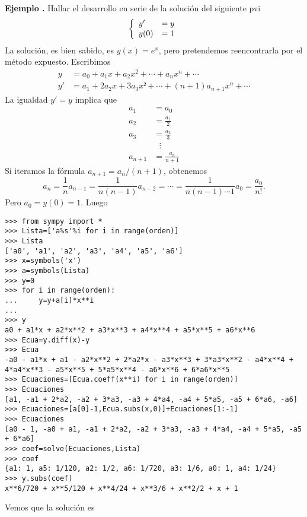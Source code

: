 \documentclass{article}
\newcounter{ejem_cont}
\newenvironment{ejemplo}[1]{\refstepcounter{ejem_cont}\vspace{1ex}\noindent\textbf{Ejemplo \arabic{ejem_cont}.} #1}{}
\begin{document}
\begin{ejemplo} Hallar el desarrollo en serie de la solución del siguiente pvi 
\[\left\{\begin{array}{l l} y'&=y\\ y(0)&=1\end{array}\right.\]
La solución, es bien sabido, es $y(x)=e^x$,  pero pretendemos reencontrarla por el método expuesto. Escribimos
\[\begin{split}
   y&=a_0+a_1x+a_2x^2+\cdots+a_nx^n+\cdots\\
   y'&=a_1+2a_2x+3a_3x²+\cdots+(n+1)a_{n+1}x^n+\cdots
  \end{split}
\]
La igualdad $y'=y$ implica que 
\[\begin{split}
   a_1&=a_0\\
   a_2&=\frac{a_1}{2}\\
   a_3&=\frac{a_2}{3}\\
      &\,\,\,\,\vdots \\
   a_{n+1}&=\frac{a_{n}}{n+1}
 \end{split}
\]
Si iteramos la fórmula $a_{n+1}=a_{n}/(n+1)$, obtenemos 
\[a_n=\frac{1}{n}a_{n-1}=\frac{1}{n(n-1)}a_{n-2}=\cdots=\frac{1}{n(n-1)\cdots 1}a_{0}=\frac{a_0}{n!}.\]
Pero $a_0=y(0)=1$. Luego 




\begin{lstlisting}
>>> from sympy import *
>>> Lista=['a%s'%i for i in range(orden)]
>>> Lista
['a0', 'a1', 'a2', 'a3', 'a4', 'a5', 'a6']
>>> x=symbols('x')
>>> a=symbols(Lista)
>>> y=0
>>> for i in range(orden):
...     y=y+a[i]*x**i   
... 
>>> y
a0 + a1*x + a2*x**2 + a3*x**3 + a4*x**4 + a5*x**5 + a6*x**6
>>> Ecua=y.diff(x)-y
>>> Ecua
-a0 - a1*x + a1 - a2*x**2 + 2*a2*x - a3*x**3 + 3*a3*x**2 - a4*x**4 + 4*a4*x**3 - a5*x**5 + 5*a5*x**4 - a6*x**6 + 6*a6*x**5
>>> Ecuaciones=[Ecua.coeff(x**i) for i in range(orden)]
>>> Ecuaciones
[a1, -a1 + 2*a2, -a2 + 3*a3, -a3 + 4*a4, -a4 + 5*a5, -a5 + 6*a6, -a6]
>>> Ecuaciones=[a[0]-1,Ecua.subs(x,0)]+Ecuaciones[1:-1]
>>> Ecuaciones
[a0 - 1, -a0 + a1, -a1 + 2*a2, -a2 + 3*a3, -a3 + 4*a4, -a4 + 5*a5, -a5 + 6*a6]
>>> coef=solve(Ecuaciones,Lista)
>>> coef
{a1: 1, a5: 1/120, a2: 1/2, a6: 1/720, a3: 1/6, a0: 1, a4: 1/24}
>>> y.subs(coef)
x**6/720 + x**5/120 + x**4/24 + x**3/6 + x**2/2 + x + 1
\end{lstlisting}


Vemos que la solución es 
\end{ejemplo}
\end{document}
